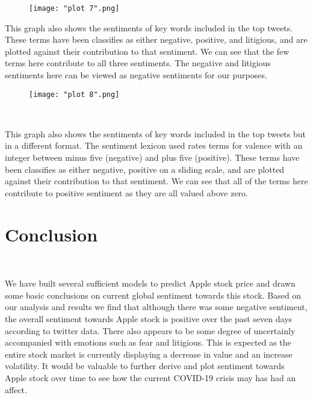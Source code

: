 \documentclass[11pt, oneside]{article}   	%
\begin{document}
\begin{figure}[! h] %
   \centering
   \texttt{[image: "plot 7".png]} 
\end{figure}

\FloatBarrier

This graph also shows the sentiments of key words included in the top tweets. These terms have been classifies as either negative, positive, and litigious, and are plotted against their contribution to that sentiment. We can see that the few terms here contribute to all three sentiments. The negative and litigious sentiments here can be viewed as negative sentiments for our purposes.

\begin{figure}[! h] %
   \centering
   \texttt{[image: "plot 8".png]} 
\end{figure}\


\FloatBarrier

This graph also shows the sentiments of key words included in the top tweets but in a different format. The sentiment lexicon used rates terms for valence with an integer between minus five (negative) and plus five (positive). These terms have been classifies as either negative, positive on a sliding scale,  and are plotted against their contribution to that sentiment. We can see that all of the terms here contribute to  positive  sentiment as they are all valued above zero.

\newpage

\section{Conclusion}\

We have built several sufficient models to predict Apple stock price and drawn some basic conclusions on current global sentiment towards this stock. Based on our analysis and results we find that although there was some negative sentiment, the overall sentiment towards Apple stock is positive over the past seven days according to twitter data. There also appears to be some degree of uncertainly accompanied with emotions such as fear and litigious. This is expected as the entire stock market is currently displaying a decrease in value and an increase volatility. It would be valuable to further derive and plot sentiment towards Apple stock over time to see how the current COVID-19 crisis may has had an affect. \\
 
\end{document}
